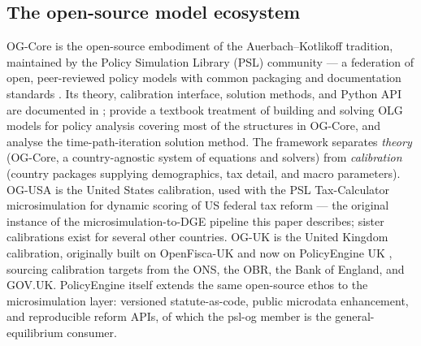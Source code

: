 \subsection{The open-source model ecosystem}
\label{subsec:psl}

OG-Core is the open-source embodiment of the Auerbach--Kotlikoff tradition, maintained by the Policy Simulation Library (PSL) community --- a federation of open, peer-reviewed policy models with common packaging and documentation standards \citep{PSLcatalog}. Its theory, calibration interface, solution methods, and Python API are documented in \citet{DeBackerEvans2024}; \citet{EvansDeBacker2024} provide a textbook treatment of building and solving OLG models for policy analysis covering most of the structures in OG-Core, and \citet{EvansPhillips2014} analyse the time-path-iteration solution method. The framework separates \emph{theory} (OG-Core, a country-agnostic system of equations and solvers) from \emph{calibration} (country packages supplying demographics, tax detail, and macro parameters). OG-USA \citep{DeBackerEvansOGUSA} is the United States calibration, used with the PSL Tax-Calculator microsimulation \citep{TaxCalculator} for dynamic scoring of US federal tax reform --- the original instance of the microsimulation-to-DGE pipeline this paper describes; sister calibrations exist for several other countries. OG-UK \citep{OGUKdocs} is the United Kingdom calibration, originally built on OpenFisca-UK and now on PolicyEngine UK \citep{PolicyEngineUK}, sourcing calibration targets from the ONS, the OBR, the Bank of England, and GOV.UK. PolicyEngine itself extends the same open-source ethos to the microsimulation layer: versioned statute-as-code, public microdata enhancement, and reproducible reform APIs, of which the psl-og member is the general-equilibrium consumer.
